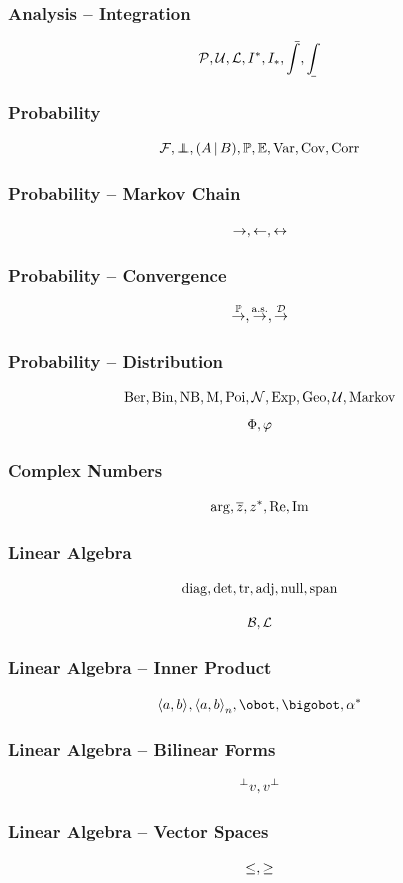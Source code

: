 \documentclass{beamer}
\begin{document}
\begin{frame}
    \frametitle{Analysis -- Integration}
    \[
        \partition, \upperSum, \lowerSum, \upperI, \lowerI, \upperInt, \lowerInt
    \]
\end{frame}

\begin{frame}
    \frametitle{Probability}
    \[
        \eventSpace, \indp, \pqty{\Conditional{A}{B}}, \Prob, \Expt, \Var, \Cov, \Corr
    \]
\end{frame}

\begin{frame}
    \frametitle{Probability -- Markov Chain}
    \[
        \rightarrow, \leftarrow, \leftrightarrow
    \]
\end{frame}

\begin{frame}
    \frametitle{Probability -- Convergence}
    \[
        \overset{\mathbb{P}}{\to}, \overset{\text{a.s.}}{\to}, \overset{\mathcal{D}}{\to}
    \]
\end{frame}

\begin{frame}
    \frametitle{Probability -- Distribution}
    \[
        \operatorname{Ber}, \operatorname{Bin}, \operatorname{NB}, \operatorname{M}, \operatorname{Poi}, \operatorname{\mathcal{N}}, \operatorname{Exp}, \operatorname{Geo}, \operatorname{\mathcal{U}}, \operatorname{Markov}
    \]
    \[
        \Phi, \varphi
    \]
\end{frame}

\begin{frame}
    \frametitle{Complex Numbers}
    \[
        \arg, \overline{z}, z^{\ast}, \Re, \Im
    \]
\end{frame}

\begin{frame}
    \frametitle{Linear Algebra}
    \[
        \operatorname{diag}, \det, \tr, \operatorname{adj}, \operatorname{null}, \operatorname{span}
    \]

    \[
        \mathcal{B}, \mathcal{L}
    \]
\end{frame}

\begin{frame}
    \frametitle{Linear Algebra -- Inner Product}
    \[
        \inner{a}{b}, \inner[n]{a}{b}, \obot, \bigobot, \adjoint{\alpha}
    \]
\end{frame}

\begin{frame}
    \frametitle{Linear Algebra -- Bilinear Forms}
    \[
        \prescript{\perp}{}v, v^{\perp}
    \]
\end{frame}

\begin{frame}
    \frametitle{Linear Algebra -- Vector Spaces}
    \[
        \leq, \geq
    \]
\end{frame}
\end{document}
